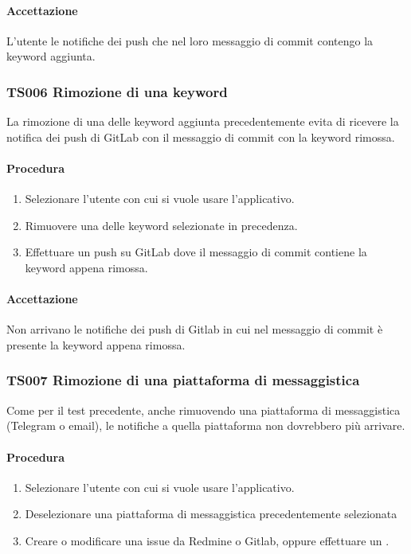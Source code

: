		\paragraph*{Accettazione}
		L'utente le notifiche dei push che nel loro messaggio di commit contengo la keyword aggiunta.
	
	\subsubsection{TS006 Rimozione di una keyword}
		La rimozione di una delle keyword aggiunta precedentemente evita di ricevere la notifica dei push di GitLab con il messaggio di commit con la keyword rimossa.
		
		\paragraph*{Procedura}
			\begin{enumerate}
				\item Selezionare l'utente con cui si vuole usare l'applicativo.
				\item Rimuovere una delle keyword selezionate in precedenza.
				\item Effettuare un push su GitLab dove il messaggio di commit contiene la keyword appena rimossa.
			\end{enumerate}
		
		\paragraph*{Accettazione}
		Non arrivano le notifiche dei push di Gitlab in cui nel messaggio di commit è presente la keyword appena rimossa.
		
	\subsubsection{TS007 Rimozione di una piattaforma di messaggistica}
		Come per il test precedente, anche rimuovendo una piattaforma di messaggistica (Telegram o email), le notifiche a quella piattaforma non dovrebbero più arrivare.
		
		\paragraph*{Procedura}
		\begin{enumerate}
			\item Selezionare l'utente con cui si vuole usare l'applicativo.
			\item Deselezionare una piattaforma di messaggistica precedentemente selezionata
			\item Creare o modificare una issue da Redmine o Gitlab, oppure effettuare un . 
		\end{enumerate}
	
